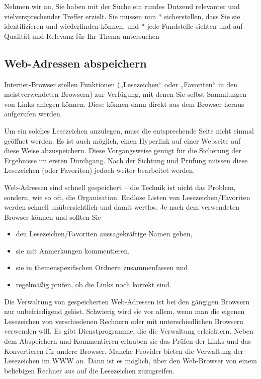 \documentclass[]{book}
\providecommand{\tightlist}{%
  \setlength{\itemsep}{0pt}\setlength{\parskip}{0pt}}
\theoremstyle{definition}
\theoremstyle{definition}
\theoremstyle{definition}
\theoremstyle{remark}
\begin{document}
Nehmen wir an, Sie haben mit der Suche ein rundes Dutzend relevanter und
vielversprechender Treffer erzielt. Sie müssen nun * sicherstellen, dass
Sie sie identifizieren und wiederfinden können, und * jede Fundstelle
sichten und auf Qualität und Relevanz für Ihr Thema untersuchen

\hypertarget{web-adressen-abspeichern}{\subsection{Web-Adressen
abspeichern}\label{web-adressen-abspeichern}}

Internet-Browser stellen Funktionen („Lesezeichen`` oder „Favoriten`` in
den meistverwendeten Browsern) zur Verfügung, mit denen Sie selbst
Sammlungen von Links anlegen können. Diese können dann direkt aus dem
Browser heraus aufgerufen werden.

Um ein solches Lesezeichen anzulegen, muss die entsprechende Seite nicht
einmal geöffnet werden. Es ist auch möglich, einen Hyperlink auf einer
Webseite auf diese Weise abzuspeichern. Diese Vorgangsweise genügt für
die Sicherung der Ergebnisse im ersten Durchgang. Nach der Sichtung und
Prüfung müssen diese Lesezeichen (oder Favoriten) jedoch weiter
bearbeitet werden.

Web-Adressen sind schnell gespeichert -- die Technik ist nicht das
Problem, sondern, wie so oft, die Organisation. Endlose Listen von
Lesezeichen/Favoriten werden schnell unübersichtlich und damit wertlos.
Je nach dem verwendeten Browser können und sollten Sie

\begin{itemize}
\tightlist
\item
  den Lesezeichen/Favoriten aussagekräftige Namen geben,
\item
  sie mit Anmerkungen kommentieren,
\item
  sie in themenspezifischen Ordnern zusammenfassen und
\item
  regelmäßig prüfen, ob die Links noch korrekt sind.
\end{itemize}

Die Verwaltung von gespeicherten Web-Adressen ist bei den gängigen
Browsern nur unbefriedigend gelöst. Schwierig wird sie vor allem, wenn
man die eigenen Lesezeichen von verschiedenen Rechnern oder mit
unterschiedlichen Browsern verwenden will. Es gibt Dienstprogramme, die
die Verwaltung erleichtern. Neben dem Abspeichern und Kommentieren
erlauben sie das Prüfen der Links und das Konvertieren für andere
Browser. Manche Provider bieten die Verwaltung der Lesezeichen im WWW
an. Dann ist es möglich, über den Web-Browser von einem beliebigen
Rechner aus auf die Lesezeichen zuzugreifen.
\end{document}
